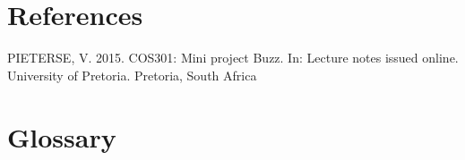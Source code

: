 \documentclass[a4paper,12pt]{report}
\begin{document}
\section{References}
PIETERSE, V. 2015. COS301: Mini project Buzz. In: Lecture notes issued online. University of Pretoria. Pretoria, South Africa

\section{Glossary}
\end{document}
